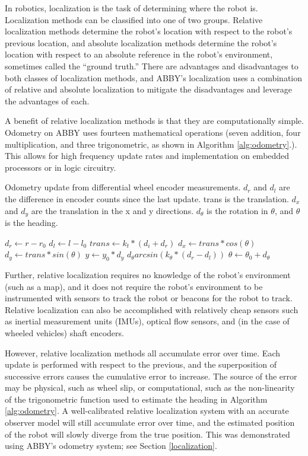 \documentclass[]{cwru} %
\begin{document}
In robotics, localization is the task of determining where the robot is.
Localization methods can be classified into one of two groups. Relative
localization methods determine the robot's location with respect to the
robot's previous location, and absolute localization methods determine
the robot's location with respect to an absolute reference in the
robot's environment, sometimes called the ``ground truth.'' There are
advantages and disadvantages to both classes of localization methods,
and ABBY's localization uses a combination of relative and absolute
localization to mitigate the disadvantages and leverage the advantages
of each.

A benefit of relative localization methods is that they are
computationally simple. Odometry on ABBY uses fourteen mathematical
operations (seven addition, four multiplication, and three
trigonometric, as shown in Algorithm \ref{alg:odometry}.). This allows for high
frequency update rates and implementation on embedded processors or in
logic circuitry.

\begin{algorithm}
\caption{Odometry update from differential wheel encoder measurements. 
$d_r$ and $d_l$ are the difference in encoder counts since the last update. trans 
is the translation. $d_x$ and $d_y$ are the translation in the x and y directions. 
$d_{\theta}$ is the rotation in $\theta$, and $\theta$ is the heading.}
\label{alg:odometry}
\begin{algorithmic}
\STATE $d_r \gets r - r_0$
\STATE $d_l \gets l - l_0$
\STATE $trans \gets k_t * (d_i + d_r)$
\STATE $d_x \gets trans * cos(\theta)$
\STATE $d_y \gets trans * sin(\theta)$
\STATE $y \gets y_0 * d_y$
\STATE $d_\theta arcsin(k_\theta * (d_r - d_l))$
\STATE $\theta \gets \theta_0 + d_\theta$
\end{algorithmic}
\end{algorithm}

Further, relative localization requires no knowledge of the robot's
environment (such as a map), and it does not require the robot's
environment to be instrumented with sensors to track the robot or
beacons for the robot to track. Relative localization can also be
accomplished with relatively cheap sensors such as inertial measurement
units (IMUs), optical flow sensors, and (in the case of wheeled
vehicles) shaft encoders.

However, relative localization methods all accumulate error over time.
Each update is performed with respect to the previous, and the
superposition of successive errors causes the cumulative error to
increase. The source of the error may be physical, such as wheel slip,
or computational, such as the non-linearity of the trigonometric
function used to estimate the heading in Algorithm \ref{alg:odometry}. A 
well-calibrated relative localization system with an accurate observer model 
will still accumulate error over time, and the estimated position of the 
robot will slowly diverge from the true position. This was demonstrated using
ABBY's odometry system; see Section \ref{localization}.
\end{document}
